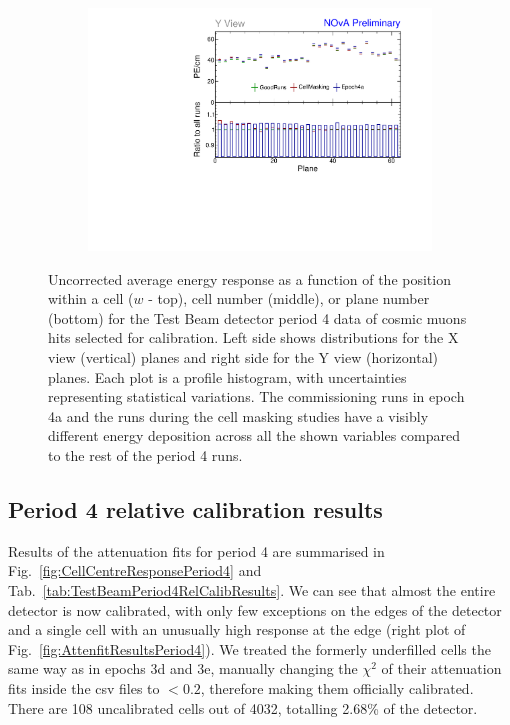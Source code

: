 \begin{figure}[!hbtp]
\begin{subfigure}[b]{0.495\textwidth}
\end{subfigure}
\begin{subfigure}[b]{0.495\textwidth}
\centering
\includegraphics[width=\textwidth]{Plots/TBCalibration/Attenprofs_P4Data_PlanePE_Y_Combined.pdf}
\end{subfigure}
\caption[Uncorrected energy response along $w$, cell and plane for period 4]{Uncorrected average energy response as a function of the position within a cell ($w$ - top), cell number (middle), or plane number (bottom) for the Test Beam detector period 4 data of cosmic muons hits selected for calibration. Left side shows distributions for the X view (vertical) planes and right side for the Y view (horizontal) planes. Each plot is a profile histogram, with uncertainties representing statistical variations. The commissioning runs in epoch 4a and the runs during the cell masking studies have a visibly different energy deposition across all the shown variables compared to the rest of the period 4 runs.}
\label{fig:Calibhist_period4}
\end{figure}

\subsection*{Period 4 relative calibration results}

Results of the attenuation fits for period 4 are summarised in Fig.~\ref{fig:CellCentreResponsePeriod4} and Tab.~\ref{tab:TestBeamPeriod4RelCalibResults}. We can see that almost the entire detector is now calibrated, with only few exceptions on the edges of the detector and a single cell with an unusually high response at the edge (right plot of Fig.~\ref{fig:AttenfitResultsPeriod4}). We treated the formerly underfilled cells the same way as in epochs 3d and 3e, manually changing the $\chi^2$ of their attenuation fits inside the csv files to $<0.2$, therefore making them officially calibrated. There are 108 uncalibrated cells out of 4032, totalling 2.68\% of the detector.

